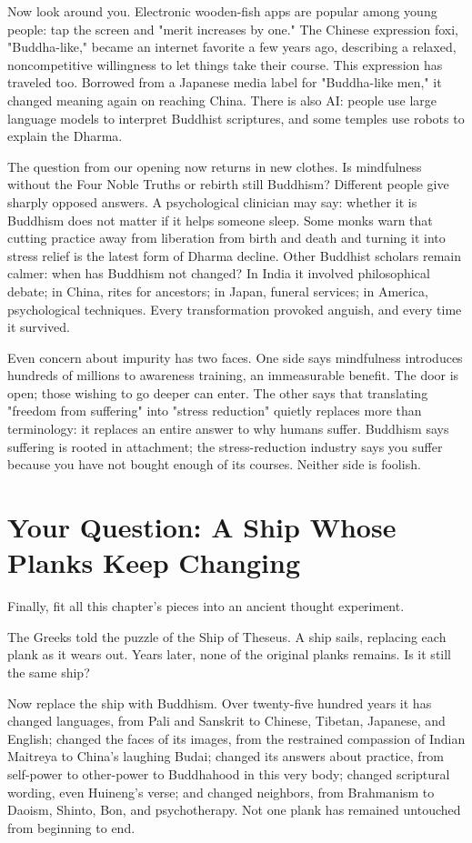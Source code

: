 Now look around you. Electronic wooden-fish apps are popular among young people: tap the screen and "merit increases by one." The Chinese expression foxi, "Buddha-like," became an internet favorite a few years ago, describing a relaxed, noncompetitive willingness to let things take their course. This expression has traveled too. Borrowed from a Japanese media label for "Buddha-like men," it changed meaning again on reaching China. There is also AI: people use large language models to interpret Buddhist scriptures, and some temples use robots to explain the Dharma.

The question from our opening now returns in new clothes. Is mindfulness without the Four Noble Truths or rebirth still Buddhism? Different people give sharply opposed answers. A psychological clinician may say: whether it is Buddhism does not matter if it helps someone sleep. Some monks warn that cutting practice away from liberation from birth and death and turning it into stress relief is the latest form of Dharma decline. Other Buddhist scholars remain calmer: when has Buddhism not changed? In India it involved philosophical debate; in China, rites for ancestors; in Japan, funeral services; in America, psychological techniques. Every transformation provoked anguish, and every time it survived.

Even concern about impurity has two faces. One side says mindfulness introduces hundreds of millions to awareness training, an immeasurable benefit. The door is open; those wishing to go deeper can enter. The other says that translating "freedom from suffering" into "stress reduction" quietly replaces more than terminology: it replaces an entire answer to why humans suffer. Buddhism says suffering is rooted in attachment; the stress-reduction industry says you suffer because you have not bought enough of its courses. Neither side is foolish.

\section[Your Question: The Changing Ship]{Your Question: A Ship Whose Planks Keep Changing}
Finally, fit all this chapter's pieces into an ancient thought experiment.

The Greeks told the puzzle of the Ship of Theseus. A ship sails, replacing each plank as it wears out. Years later, none of the original planks remains. Is it still the same ship?

Now replace the ship with Buddhism. Over twenty-five hundred years it has changed languages, from Pali and Sanskrit to Chinese, Tibetan, Japanese, and English; changed the faces of its images, from the restrained compassion of Indian Maitreya to China's laughing Budai; changed its answers about practice, from self-power to other-power to Buddhahood in this very body; changed scriptural wording, even Huineng's verse; and changed neighbors, from Brahmanism to Daoism, Shinto, Bon, and psychotherapy. Not one plank has remained untouched from beginning to end.

